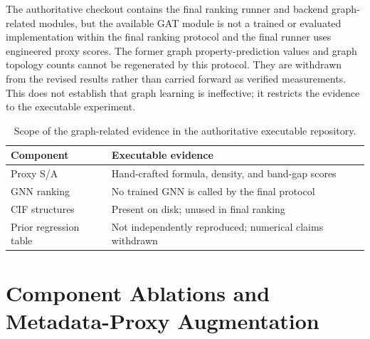 \documentclass[12pt,a4paper]{article}
\begin{document}
The authoritative checkout contains the final ranking runner and backend graph-related modules, but the available GAT module is not a trained or evaluated implementation within the final ranking protocol and the final runner uses engineered proxy scores. The former graph property-prediction values and graph topology counts cannot be regenerated by this protocol. They are withdrawn from the revised results rather than carried forward as verified measurements. This does not establish that graph learning is ineffective; it restricts the evidence to the executable experiment.
\begin{table}[H]\centering\small
\caption{Scope of the graph-related evidence in the authoritative executable repository.}\label{tab:gnn}
\begin{tabular}{p{3.1cm}p{10.3cm}}
\toprule
Component & Executable evidence\\\midrule
Proxy S/A & Hand-crafted formula, density, and band-gap scores\\
GNN ranking & No trained GNN is called by the final protocol\\
CIF structures & Present on disk; unused in final ranking\\
Prior regression table & Not independently reproduced; numerical claims withdrawn\\
\bottomrule\end{tabular}\end{table}


\section{Component Ablations and Metadata-Proxy Augmentation}
\label{sec:ablation}
\end{document}
